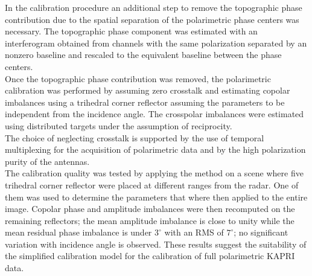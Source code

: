 In the calibration procedure an additional step to remove the topographic phase contribution due to the spatial separation of the polarimetric phase centers was necessary. The topographic phase component was estimated with an interferogram obtained from channels with the same polarization separated by an nonzero baseline and rescaled to the equivalent baseline between the phase centers.\\ Once the topographic phase contribution was removed, the polarimetric calibration was performed by assuming zero crosstalk and estimating copolar imbalances using a trihedral corner reflector assuming the parameters to be independent from the  incidence angle. The crosspolar imbalances were estimated using distributed targets under the assumption of reciprocity.\\ The choice of neglecting crosstalk is supported by the use of temporal multiplexing for the acquisition of polarimetric data and by the high polarization purity of the antennas.\\ The calibration quality was tested by applying the method on a scene where five trihedral corner reflector were placed at different ranges from the radar. One of them was used to determine the parameters that where then applied to the entire image. Copolar phase and amplitude imbalances were then recomputed on the remaining reflectors; the mean amplitude imbalance is close to unity while the mean residual phase imbalance is under $3^\circ$ with an RMS of $7^\circ$; no significant variation with incidence angle is observed. These results suggest the suitability of the simplified calibration model for the calibration of full polarimetric KAPRI data.